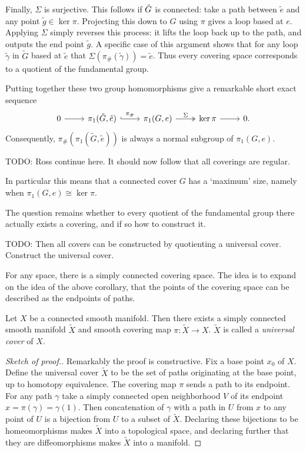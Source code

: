 Finally, $\Sigma$ is surjective.
This follows if $\Tilde{G}$ is connected: take a path between $\tilde{e}$ and any point $\tilde{g} \in \ker \pi$.
Projecting this down to $G$ using $\pi$ gives a loop based at $e$.
Applying $\Sigma$ simply reverses this process: it lifts the loop back up to the path, and outputs the end point $\tilde{g}$.
A specific case of this argument shows that for any loop $\tilde{\gamma}$ in $\tilde{G}$ based at $\tilde{e}$ that $\Sigma(\pi_\#(\tilde{\gamma})) = \tilde{e}$.
Thus every covering space corresponds to a quotient of the fundamental group.

Putting together these two group homomorphisms give a remarkable short exact sequence
\[
\begin{tikzcd}
0 \arrow[r] & \pi_1(\tilde{G},\tilde{e}) \arrow[r, hook, "\pi_\#"] & \pi_1(G,e) \arrow[r, two heads, "\Sigma"] & \ker \pi \arrow[r] & 0.
\end{tikzcd}
\]
Consequently, $\pi_\#(\pi_1(\tilde{G},\tilde{e}))$ is always a normal subgroup of $\pi_1(G,e)$.

TODO: Ross continue here. It should now follow that all coverings are regular.


In particular this means that a connected cover $G$ has a `maximum' size, namely when $\pi_1(G,e) \cong \ker \pi$.

The question remains whether to every quotient of the fundamental group there actually exists a covering, and if so how to construct it.


TODO: Then all covers can be constructed by quotienting a universal cover. Construct the universal cover.


For any space, there is a simply connected covering space.
The idea is to expand on the idea of the above corollary, that the points of the covering space can be described as the endpoints of paths.

\begin{theorem}
\textup{\cite[p.63]{Hatcher2002}}
Let $X$ be a connected smooth manifold.
Then there exists a simply connected smooth manifold $\tilde{X}$ and smooth covering map $\pi : \tilde{X} \to X$.
$\tilde{X}$ is called a \emph{universal cover} of $X$. 
\end{theorem}
\begin{proof}[Sketch of proof.]
Remarkably the proof is constructive.
Fix a base point $x_0$ of $X$.
Define the universal cover $\tilde{X}$ to be the set of paths originating at the base point, up to homotopy equivalence.
The covering map $\pi$ sends a path to its endpoint.
For any path $\gamma$ take a simply connected open neighborhood $V$ of its endpoint $x = \pi(\gamma) = \gamma(1)$.
Then concatenation of $\gamma$ with a path in $U$ from $x$ to any point of $U$ is a bijection from $U$ to a subset of $\tilde{X}$.
Declaring these bijections to be homeomorphisms makes $\tilde{X}$ into a topological space, and declaring further that they are diffeomorphisms makes $\tilde{X}$ into a manifold.
\end{proof}

